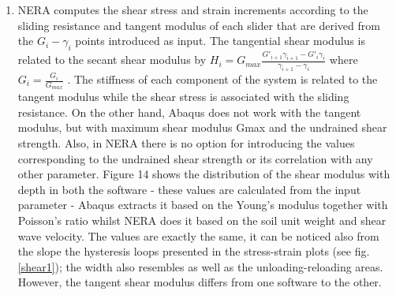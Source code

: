 \begin{enumerate}
		\item NERA computes the shear stress and strain increments according to the sliding resistance and tangent modulus of each slider that are derived from the $G_i-\gamma_i$ points introduced as input. The tangential shear modulus is related to the secant shear modulus by $H_i=G_{max}\frac{G'_{i+1}\gamma_{i+1}-G'_i\gamma_i}{\gamma_{i+1}-\gamma_i}$ where $G_i=\frac{G_i}{G_{max}}$ . The stiffness of each component of the system is related to the tangent modulus while the shear stress is associated with the sliding resistance. On the other hand, Abaqus does not work with the tangent modulus, but with maximum shear modulus Gmax and the undrained shear strength. Also, in NERA there is no option for introducing the values corresponding to the undrained shear strength or its correlation with any other parameter. Figure 14 shows the distribution of the shear modulus with depth in both the software - these values are calculated from the input parameter - Abaqus extracts it based on the Young's modulus together with Poisson's ratio whilst NERA does it based on the soil unit weight and shear wave velocity. The values are exactly the same, it can be noticed also from the slope the hysteresis loops presented in the stress-strain plots (see fig. \ref{shear1}); the width also resembles as well as the unloading-reloading areas. However, the tangent shear modulus differs from one software to the other.


\end{enumerate}
